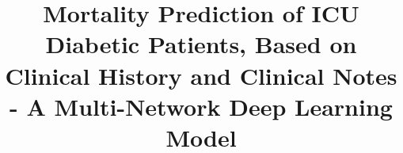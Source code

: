 \documentclass{sigkddExp}
\begin{document}

\title{Mortality Prediction of ICU Diabetic Patients, Based on Clinical History and Clinical Notes - A Multi-Network Deep Learning Model}
%

%

\end{document}
